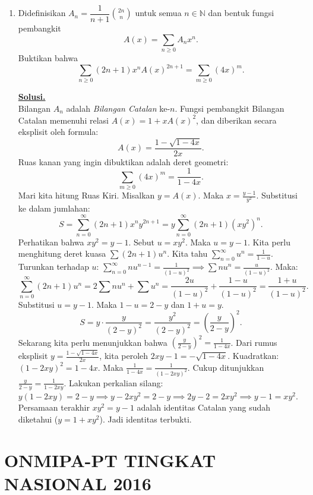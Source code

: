 \documentclass[12pt,twoside]{article}
\newenvironment{solution}
{
	\par\noindent\textbf{\underline{Solusi.}}\\
}
{
	\par
}
\begin{document}
\begin{enumerate}
  \item Didefinisikan $\displaystyle A_n=\dfrac{1}{n+1}\binom{2n}{n}$ untuk semua $n\in\mathbb{N}$ dan bentuk fungsi pembangkit
        $$A(x)=\sum_{n\geq 0}A_nx^n.$$
        Buktikan bahwa
        $$\sum_{n\geq 0}(2n+1)x^nA(x)^{2n+1}=\sum_{m\geq 0}(4x)^m.$$
        \begin{solution}
          Bilangan $A_n$ adalah \textit{Bilangan Catalan} ke-$n$.
          Fungsi pembangkit Bilangan Catalan memenuhi relasi $A(x) = 1 + xA(x)^2$, dan diberikan secara eksplisit oleh formula:
          $$ A(x) = \frac{1 - \sqrt{1-4x}}{2x}. $$
          Ruas kanan yang ingin dibuktikan adalah deret geometri:
          $$ \sum_{m \ge 0} (4x)^m = \frac{1}{1-4x}. $$
          Mari kita hitung Ruas Kiri. Misalkan $y = A(x)$. Maka $x = \frac{y-1}{y^2}$.
          Substitusi ke dalam jumlahan:
          $$ S = \sum_{n=0}^\infty (2n+1) x^n y^{2n+1} = y \sum_{n=0}^\infty (2n+1) (xy^2)^n. $$
          Perhatikan bahwa $xy^2 = y-1$. Sebut $u = xy^2$. Maka $u = y-1$.
          Kita perlu menghitung deret kuasa $\sum (2n+1)u^n$.
          Kita tahu $\sum_{n=0}^\infty u^n = \frac{1}{1-u}$.
          Turunkan terhadap $u$: $\sum_{n=0}^\infty n u^{n-1} = \frac{1}{(1-u)^2} \implies \sum n u^n = \frac{u}{(1-u)^2}$.
          Maka:
          $$ \sum_{n=0}^\infty (2n+1)u^n = 2 \sum n u^n + \sum u^n = \frac{2u}{(1-u)^2} + \frac{1-u}{(1-u)^2} = \frac{1+u}{(1-u)^2}. $$
          Substitusi $u = y-1$. Maka $1-u = 2-y$ dan $1+u = y$.
          $$ S = y \cdot \frac{y}{(2-y)^2} = \frac{y^2}{(2-y)^2} = \left( \frac{y}{2-y} \right)^2. $$
          Sekarang kita perlu menunjukkan bahwa $\left( \frac{y}{2-y} \right)^2 = \frac{1}{1-4x}$.
          Dari rumus eksplisit $y = \frac{1 - \sqrt{1-4x}}{2x}$, kita peroleh $2xy - 1 = -\sqrt{1-4x}$.
          Kuadratkan: $(1-2xy)^2 = 1-4x$.
          Maka $\frac{1}{1-4x} = \frac{1}{(1-2xy)^2}$.
          Cukup ditunjukkan $\frac{y}{2-y} = \frac{1}{1-2xy}$.
          Lakukan perkalian silang: $y(1-2xy) = 2-y \implies y - 2xy^2 = 2 - y \implies 2y - 2 = 2xy^2 \implies y-1 = xy^2$.
          Persamaan terakhir $xy^2 = y-1$ adalah identitas Catalan yang sudah diketahui ($y = 1+xy^2$).
          Jadi identitas terbukti.
        \end{solution}
\end{enumerate}
\newpage
{}
\section{ONMIPA-PT TINGKAT NASIONAL 2016}
\end{document}
